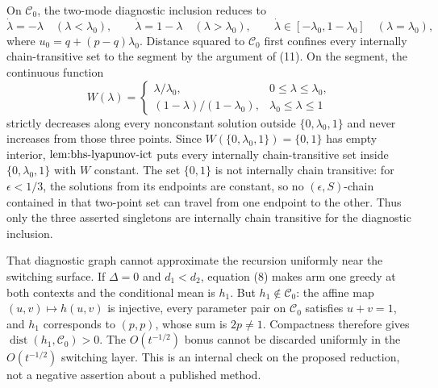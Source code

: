 On \(\mathcal C_0\), the two-mode diagnostic inclusion reduces to
\[
 \dot\lambda=-\lambda\quad(\lambda<\lambda_0),\qquad
 \dot\lambda=1-\lambda\quad(\lambda>\lambda_0),\qquad
 \dot\lambda\in[-\lambda_0,1-\lambda_0]\quad(\lambda=\lambda_0), \tag{14}
\]
where \(u_0=q+(p-q)\lambda_0\). Distance squared to \(\mathcal C_0\) first confines every internally chain-transitive set to the segment by the argument of (11). On the segment, the continuous function
\[
 W(\lambda)=
 \begin{cases}
 \lambda/\lambda_0,&0\leq\lambda\leq\lambda_0,\\
 (1-\lambda)/(1-\lambda_0),&\lambda_0\leq\lambda\leq1
 \end{cases}
\]
strictly decreases along every nonconstant solution outside \(\{0,\lambda_0,1\}\) and never increases from those three points. Since \(W(\{0,\lambda_0,1\})=\{0,1\}\) has empty interior, \(\textnormal{lem:bhs-lyapunov-ict}\) puts every internally chain-transitive set inside \(\{0,\lambda_0,1\}\) with \(W\) constant. The set \(\{0,1\}\) is not internally chain transitive: for \(\epsilon<1/3\), the solutions from its endpoints are constant, so no \((\epsilon,S)\)-chain contained in that two-point set can travel from one endpoint to the other. Thus only the three asserted singletons are internally chain transitive for the diagnostic inclusion.

That diagnostic graph cannot approximate the recursion uniformly near the switching surface. If \(\Delta=0\) and \(d_1<d_2\), equation (8) makes arm one greedy at both contexts and the conditional mean is \(h_1\). But \(h_1\notin\mathcal C_0\): the affine map \((u,v)\mapsto h(u,v)\) is injective, every parameter pair on \(\mathcal C_0\) satisfies \(u+v=1\), and \(h_1\) corresponds to \((p,p)\), whose sum is \(2p\ne1\). Compactness therefore gives \(\operatorname{dist}(h_1,\mathcal C_0)>0\). The \(O(t^{-1/2})\) bonus cannot be discarded uniformly in the \(O(t^{-1/2})\) switching layer. This is an internal check on the proposed reduction, not a negative assertion about a published method.


